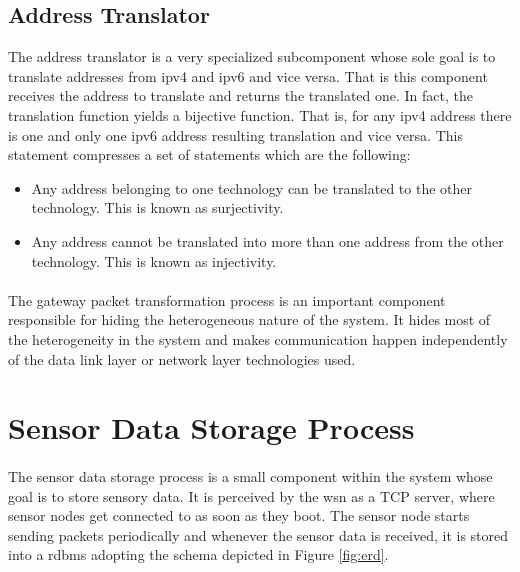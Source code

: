 \documentclass[12pt,a4paper,final]{report}
\begin{document}
\subsection{Address Translator}
The address translator is a very specialized subcomponent whose sole goal is to translate addresses from \gls{ipv4} and \gls{ipv6} and vice versa. That is this component receives the address to translate and returns the translated one. In fact, the translation function yields a bijective function. That is, for any \gls{ipv4} address there is one and only one \gls{ipv6} address resulting translation and vice versa. This statement compresses a set of statements which are the following:

\begin{itemize}
\item Any address belonging to one technology can be translated to the other technology. This is known as surjectivity.
\item Any address cannot be translated into more than one address from the other technology. This is known as injectivity.
\end{itemize}

\paragraph{}
The gateway packet transformation process is an important component responsible for hiding the heterogeneous nature of the system. It hides most of the heterogeneity in the system and makes communication happen independently of the data link layer or network layer technologies used.

\section{Sensor Data Storage Process}
\paragraph{}
The sensor data storage process is a small component within the system whose goal is to store sensory data. It is perceived by the \gls{wsn} as a TCP server, where sensor nodes get connected to as soon as they boot. The sensor node starts sending packets periodically and whenever the sensor data is received, it is stored into a \gls{rdbms} adopting the schema depicted in Figure \ref{fig:erd}.
\end{document}
